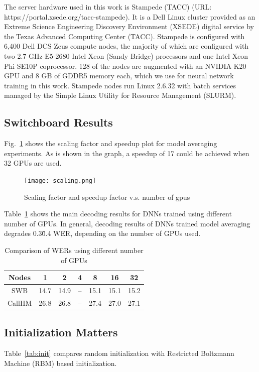 \documentclass{article}
\begin{document}
The server hardware used in this work is Stampede (TACC) (URL: https://portal.xsede.org/tacc-stampede). It is a Dell Linux 
cluster provided as an Extreme Science Engineering Discovery Environment (XSEDE) digital service by the Texas Advanced 
Computing Center (TACC). Stampede is configured with 6,400 Dell DCS Zeus compute nodes, the majority of which are configured
with two 2.7 GHz E5-2680 Intel Xeon (Sandy Bridge) processors and one Intel Xeon Phi SE10P coprocessor. 128 of the nodes are 
augmented with an NVIDIA K20 GPU and 8 GB of GDDR5 memory each, which we use for neural network training in this work.
Stampede nodes run Linux 2.6.32 with batch services managed by the Simple Linux Utility for Resource Management (SLURM).

\subsection{Switchboard Results}
Fig.~\ref{fig:scaling} shows the scaling factor and speedup plot for model averaging experiments. As is shown in the graph,
a speedup of 17 could be achieved when 32 GPUs are used.
\begin{figure}[htb]
  \centering
  \texttt{[image: scaling.png]}
  \caption{Scaling factor and speedup factor v.s. number of gpus}
  \label{fig:scaling}
\end{figure}
Table~\ref{tab:wer} shows the main decoding results for DNNs trained using different number of GPUs. In general, decoding
results of DNNs trained model averaging degrades 0.3\~0.4 WER, depending on the number of GPUs used.
\begin{table}
  \centering
  \begin{tabular}{c|c|c|c|c|c|c}
    \hline
     Nodes  & 1    & 2    & 4   & 8      & 16     & 32\\
    \hline
    SWB     & 14.7 & 14.9 & --  & 15.1   & 15.1   & 15.2\\
    CallHM  & 26.8 & 26.8 & --  & 27.4   & 27.0   & 27.1 \\
    \hline
  \end{tabular}
  \caption{Comparison of WERs using different number of GPUs}
  \label{tab:wer}
\end{table}

\subsection{Initialization Matters}
\label{sec:init}
Table~\ref{tab:init} compares random initialization with Restricted Boltzmann Machine (RBM) based initialization.
\end{document}
